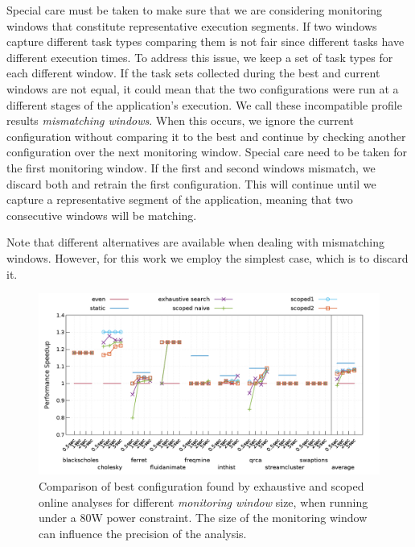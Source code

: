 Special care must be taken to make sure that we are considering monitoring windows that
constitute representative execution segments.  If two windows capture different task types
comparing them is not fair since different tasks have different execution times.  To
address this issue, we keep a set of task types for each different window.  If the task
sets collected during the best and current windows are not equal, it could mean that the
two configurations were run at a different stages of the application's execution.  We call
these incompatible profile results \textit{mismatching windows}.  When this occurs, we
ignore the current configuration without comparing it to the best and continue by checking
another configuration over the next monitoring window.  Special care need to be taken for
the first monitoring window.  If the first and second windows mismatch, we discard both
and retrain the first configuration.  This will continue until we capture a representative
segment of the application, meaning that two consecutive windows will be matching.

Note that different alternatives are available when dealing with mismatching windows.
However, for this work we employ the simplest case, which is to discard it.

 
\begin{figure}[t]
        \includegraphics[width=\textwidth]{power_aware_runtime/figures/dynamic_window_impact}
        \caption{Comparison of best configuration found by exhaustive and scoped online analyses for different \textit{monitoring window} size, when running under a 80W power constraint.
                        The size of the monitoring window can influence the precision of the analysis.}
        \label{fig:mon_win_size_impact}%
\vspace{.5cm}
\end{figure}




